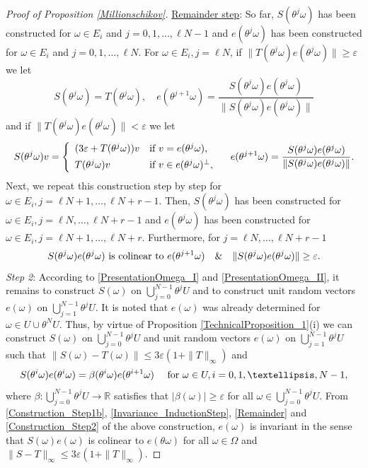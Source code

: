 \documentclass[10pt,a4paper]{amsart}
\newcommand{\R}{\mathbb{R}}
\newcommand{\eps}{\varepsilon}
\begin{document}
\begin{proof}[Proof of Proposition \ref{Millionschikov}]
\noindent 
\underline{Remainder step}: So far, $S(\theta^j\omega)$ has been constructed for $\omega\in E_i$ and $j=0,1,\dots,\ell N-1$ and $e(\theta^j\omega)$ has been constructed for $\omega\in E_i$ and $j=0,1,\dots,\ell N$. For $\omega\in E_i, j=\ell N$, if $\|T(\theta^{j}\omega) e(\theta^{j}\omega)\|\geq \eps$ we let 
\[
S(\theta^{j}\omega)=T(\theta^{j}\omega),\quad   e(\theta^{j+1}\omega)=\frac{S(\theta^j\omega) e(\theta^j\omega)}{\|S(\theta^j\omega) e(\theta^j\omega)\|}
\]
and if $\|T(\theta^{j}\omega) e(\theta^{j}\omega)\|< \eps$ we let
\[
S(\theta^j\omega) v
=
\left\{
\begin{array}{ll}
  (3\eps+T(\theta^j\omega)) v   & \hbox{if } v=e(\theta^j\omega),\\[1ex]
T(\theta^j\omega) v   &  \hbox{if } v\in e(\theta^j\omega)^{\perp},
\end{array}
\right.\quad e(\theta^{j+1}\omega)=\frac{S(\theta^j\omega) e(\theta^j\omega)}{\|S(\theta^j\omega) e(\theta^j\omega)\|}.
\]
Next, we repeat this construction step by step for  $\omega\in E_i, j=\ell N+1,\dots, \ell N+r-1$. Then, $S(\theta^j\omega)$ has been constructed for $\omega \in E_i, j=\ell N,\dots,\ell N+r-1$ and $e(\theta^j\omega)$ has been constructed for $\omega\in E_i, j=\ell N+1,\dots,\ell N+r$. Furthermore, for $j=\ell N,\dots,\ell N+r-1$
\begin{equation}\label{Remainder}
S(\theta^j\omega)e(\theta^j\omega) \hbox{ is colinear to } e(\theta^{j+1}\omega)
\quad \&\quad \|S(\theta^j\omega)e(\theta^j\omega)\|\geq \eps.
\end{equation}
\emph{Step 2}: According to \eqref{PresentationOmega_I} and \eqref{PresentationOmega_II}, it remains to construct $S(\omega)$ on $\bigcup_{j=0}^{N-1}\theta^j U$ and to construct unit random vectors $e(\omega)$ on $\bigcup_{j=1}^{N-1} \theta^j U$. It is noted that $e(\omega)$ was already determined for $\omega\in U\cup\theta^N U$. Thus, by virtue of Proposition \ref{TechnicalProposition_1}(i) we can construct $S(\omega)$ on $\bigcup_{j=0}^{N-1}\theta^j U$ and unit random vectors $e(\omega)$ on  $\bigcup_{j=1}^{N-1} \theta^j U$ such that $\|S(\omega)-T(\omega)\|\leq 3\eps(1+\|T\|_{\infty})$ and 
\begin{equation}\label{Construction_Step2}
S(\theta^i\omega)e(\theta^i\omega)=\beta(\theta^i\omega)e(\theta^{i+1}\omega)\quad \hbox{ for } \omega\in U, i=0,1,\dots,N-1,
\end{equation}
where $\beta: \bigcup_{j=0}^{N-1}\theta^j U\rightarrow \R$ satisfies that $|\beta(\omega)|\geq \eps$ for all $\omega\in \bigcup_{j=0}^{N-1}\theta^j U$.
From \eqref{Construction_Step1b}, \eqref{Invariance_InductionStep}, \eqref{Remainder} and \eqref{Construction_Step2} of  the above construction,  $e(\omega)$ is invariant in the sense that $S(\omega)e(\omega)$ is colinear to $e(\theta\omega)$ for all $\omega\in\Omega$ and $\|S-T\|_{\infty}\leq 3\eps(1+\|T\|_{\infty})$. 


\end{proof}
\end{document}
